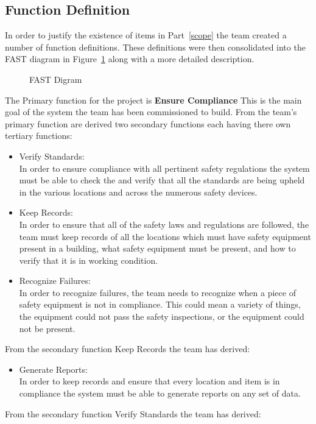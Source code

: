 \documentclass[Letter,11pt]{article}
\begin{document}
	\subsection{Function Definition} 
		In order to justify the existence of items in Part~\ref{scope} the team created a number of function definitions. These definitions were then consolidated into the FAST diagram in Figure~\ref{fast1} along with a more detailed description.
		\begin{figure}[h]
			\centering
			
			\caption{\label{fast1} FAST Digram}
		\end{figure}
		The Primary function for the project is \textbf{Ensure Compliance} This is the main goal of the system the team has been commissioned to build. From the team's primary function are derived two secondary functions each having there own tertiary functions:
		\begin{itemize}
			\item Verify Standards:\\
			In order to ensure compliance with all pertinent safety regulations the system must be able to check the and verify that all the standards are being upheld in the various locations and across the numerous safety devices.
			\item Keep Records:\\
			In order to ensure that all of the safety laws and regulations are followed, the team must keep records of all the locations which must have safety equipment present in a building, what safety equipment must be present, and how to verify that it is in working condition.  

			\item Recognize Failures:\\
			In order to recognize failures, the team needs to recognize when a piece of safety equipment is not in compliance. This could mean a variety of things, the equipment could not pass the safety inspections, or the equipment could not be present.   
		\end{itemize}
		From the secondary function Keep Records the team has derived: 
		\begin{itemize}
			\item Generate Reports:\\
			In order to keep records and ensure that every location and item is in compliance the system must be able to generate reports on any set of data. 
		\end{itemize}
		From the secondary function Verify Standards the team has derived:
\end{document}

